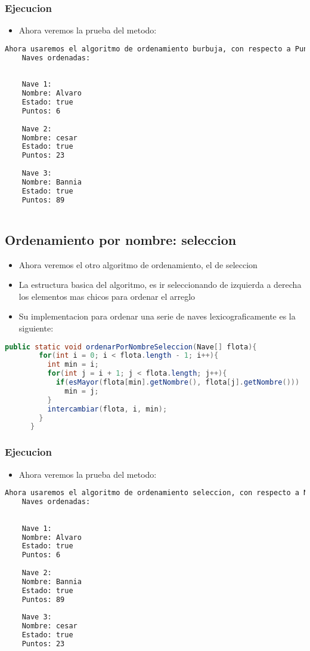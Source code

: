 \subsubsection{Ejecucion}
\begin{itemize}
    \item Ahora veremos la prueba del metodo:
\end{itemize}
    \begin{lstlisting}[language=bash, caption={Prueba del metodo}]
    Ahora usaremos el algoritmo de ordenamiento burbuja, con respecto a Puntos.
    Naves ordenadas:
    
    
    Nave 1:
    Nombre: Alvaro
    Estado: true
    Puntos: 6
    
    Nave 2:
    Nombre: cesar
    Estado: true
    Puntos: 23
    
    Nave 3:
    Nombre: Bannia
    Estado: true
    Puntos: 89
     
\end{lstlisting}

\subsection{Ordenamiento por nombre: seleccion}
\begin{itemize}
    \item Ahora veremos el otro algoritmo de ordenamiento, el de seleccion
    \item La estructura basica del algoritmo, es ir seleccionando de izquierda a derecha los elementos mas chicos para ordenar el arreglo
    \item Su implementacion para ordenar una serie de naves lexicograficamente es la siguiente:
\end{itemize}
\begin{lstlisting}[language=java, caption={Metodo para ordenar por nombre}]
      public static void ordenarPorNombreSeleccion(Nave[] flota){
        for(int i = 0; i < flota.length - 1; i++){
          int min = i;
          for(int j = i + 1; j < flota.length; j++){
            if(esMayor(flota[min].getNombre(), flota[j].getNombre()))
              min = j;
          }
          intercambiar(flota, i, min);
        }
      }
\end{lstlisting}
\subsubsection{Ejecucion}
\begin{itemize}
    \item Ahora veremos la prueba del metodo:
\end{itemize}
    \begin{lstlisting}[language=bash, caption={Prueba del metodo}]
    Ahora usaremos el algoritmo de ordenamiento seleccion, con respecto a Nombres.
    Naves ordenadas:
    
    
    Nave 1:
    Nombre: Alvaro
    Estado: true
    Puntos: 6
    
    Nave 2:
    Nombre: Bannia
    Estado: true
    Puntos: 89
    
    Nave 3:
    Nombre: cesar
    Estado: true
    Puntos: 23
    
\end{lstlisting}


